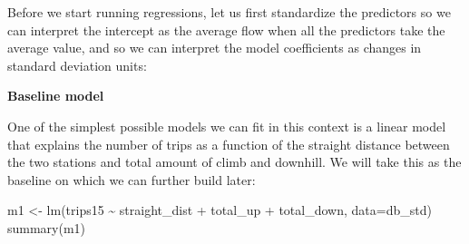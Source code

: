 \documentclass[
  letterpaper,
  DIV=11,
  numbers=noendperiod,
  oneside]{scrreprt}
\newenvironment{Shaded}{\begin{snugshade}}{\end{snugshade}}
\newcommand{\AttributeTok}[1]{\textcolor[rgb]{0.40,0.45,0.13}{#1}}
\newcommand{\CommentTok}[1]{\textcolor[rgb]{0.37,0.37,0.37}{#1}}
\newcommand{\FunctionTok}[1]{\textcolor[rgb]{0.28,0.35,0.67}{#1}}
\newcommand{\NormalTok}[1]{\textcolor[rgb]{0.00,0.23,0.31}{#1}}
\newcommand{\OtherTok}[1]{\textcolor[rgb]{0.00,0.23,0.31}{#1}}
\newcommand{\SpecialCharTok}[1]{\textcolor[rgb]{0.37,0.37,0.37}{#1}}
\newcommand{\StringTok}[1]{\textcolor[rgb]{0.13,0.47,0.30}{#1}}
\begin{document}
Before we start running regressions, let us first standardize the
predictors so we can interpret the intercept as the average flow when
all the predictors take the average value, and so we can interpret the
model coefficients as changes in standard deviation units:

\begin{Shaded}
\end{Shaded}

\textbf{Baseline model}

One of the simplest possible models we can fit in this context is a
linear model that explains the number of trips as a function of the
straight distance between the two stations and total amount of climb and
downhill. We will take this as the baseline on which we can further
build later:

\begin{Shaded}
\begin{Highlighting}[]
\NormalTok{m1 }\OtherTok{\textless{}{-}} \FunctionTok{lm}\NormalTok{(}\StringTok{\textquotesingle{}trips15 \textasciitilde{} straight\_dist + total\_up + total\_down\textquotesingle{}}\NormalTok{, }\AttributeTok{data=}\NormalTok{db\_std)}
\FunctionTok{summary}\NormalTok{(m1)}
\end{Highlighting}
\end{Shaded}
\end{document}
